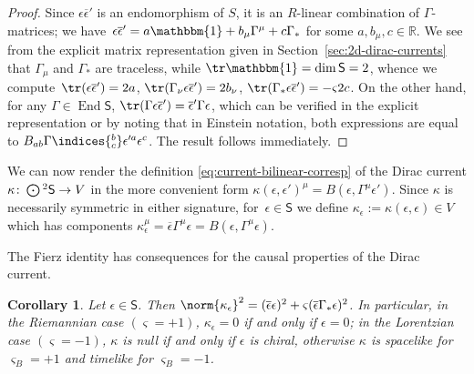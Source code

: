 \documentclass[10pt,a4paper]{amsart}
\numberwithin{equation}{section}
\newtheorem{Corollary}[Theorem]{Corollary}
\newcommand{\RR}{\mathbb{R}}
\newcommand{\ssS}{\mathsf{S}}
\newcommand{\Odot}{\mathchoice{{\textstyle\bigodot}}{\bigodot}{\bigodot}{\bigodot}}
\newcommand{\1}{\mathbbm{1}}
\DeclareMathOperator{\End}{End}
\begin{document}
\begin{proof}
	Since $\epsilon\overline\epsilon'$ is an endomorphism of $S$, it is an $R$-linear combination of $\Gamma$-matrices; we have~${
		\epsilon\overline\epsilon' = a\1 + b_\mu\Gamma^\mu + c\Gamma_*}
$
	for some $a,b_\mu,c\in\RR$. We see from the explicit matrix representation given in Section~\ref{sec:2d-dirac-currents} that $\Gamma_\mu$ and $\Gamma_*$ are traceless, while $\tr\1=\dim \ssS = 2$, whence we compute~${\tr(\epsilon\overline\epsilon') = 2a}$,	
$\tr(\Gamma_\nu\epsilon\overline\epsilon') = 2b_\nu$, $
		\tr(\Gamma_*\epsilon\overline\epsilon') = -\varsigma2c$.
	On the other hand, for any $\Gamma\in\End \ssS$, $\tr(\Gamma\epsilon\overline\epsilon')=\overline\epsilon'\Gamma\epsilon$, which can be verified in the explicit representation or by noting that in Einstein notation, both expressions are equal to $B_{ab}\Gamma\indices{^b_c}\epsilon'^a\epsilon^c$. The result follows immediately.
\end{proof}

We can now render the definition \eqref{eq:current-bilinear-corresp} of the Dirac current $\kappa\colon\Odot^2\ssS\to V$ in the more convenient form
$\kappa(\epsilon,\epsilon')^\mu = B(\epsilon,\Gamma^\mu\epsilon')$.
Since $\kappa$ is necessarily symmetric in either signature, for~$\epsilon\in \ssS$ we define $\kappa_\epsilon:=\kappa(\epsilon,\epsilon)\in V$ which has components
$
	\kappa_\epsilon^\mu=\overline\epsilon\Gamma^\mu\epsilon=B(\epsilon,\Gamma^\mu\epsilon)$.

The Fierz identity has consequences for the causal properties of the Dirac current.

\begin{Corollary}\label{coro:2d-dirac-causality}
	Let $\epsilon\in \ssS$. Then
$
		\norm{\kappa_\epsilon}^2 = (\overline\epsilon\epsilon)^2 + \varsigma(\overline\epsilon\Gamma_*\epsilon)^2$.
	In particular, in the Riemannian case $(\varsigma=+1)$, $\kappa_\epsilon=0$ if and only if $\epsilon=0$; in the Lorentzian case $(\varsigma=-1)$, $\kappa$ is null if and only if $\epsilon$ is chiral, otherwise $\kappa$ is spacelike for $\varsigma_B=+1$ and timelike for $\varsigma_B=-1$.
\end{Corollary}
\end{document}
